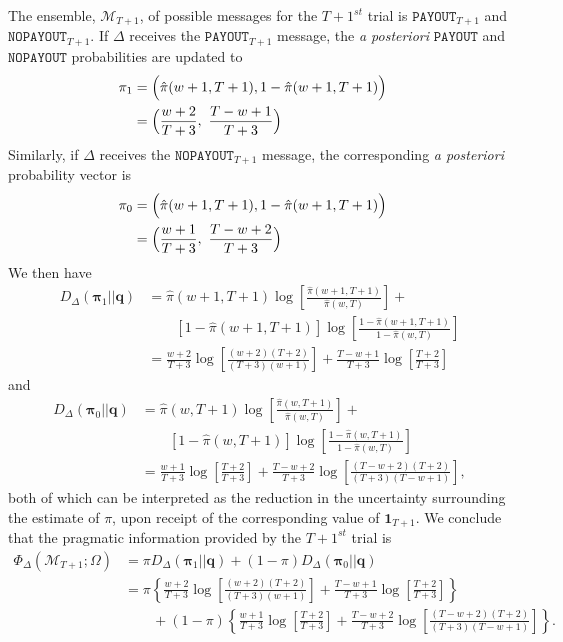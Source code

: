 \documentclass[11pt]{article}
\begin{document}
The ensemble, $\mathcal M_{T+1}$, of possible messages for the $T+1^{st}$ trial is $\mathtt{PAYOUT}_{T+1}$ and $\mathtt{NO PAYOUT}_{T+1}$.  If $\Delta$ receives the $\mathtt{PAYOUT}_{T+1}$ message, 
the {\it a posteriori} $\mathtt{PAYOUT}$ and $\mathtt{NO PAYOUT}$ probabilities are updated to
\begin{align*}
\mathbf \pi_1 &= \Big(\hat \pi(w+1, T+1), 1 - \hat \pi(w+1, T+1)\Big) \cr
                  &= \Big(\frac{w+2}{T+3},\ \frac{T-w+1}{T+3}\Big) \cr
\end{align*}
Similarly, if $\Delta$ receives the $\mathtt{NOPAYOUT}_{T+1}$ message,
the corresponding {\it a posteriori} probability vector is
\begin{align*}
\mathbf \pi_0 &= \Big(\hat \pi(w+1, T+1), 1 - \hat \pi(w+1, T+1)\Big) \cr
                  &= \Big(\frac{w+1}{T+3},\ \frac{T-w+2}{T+3}\Big) \cr
\end{align*}
We then have 
\begin{align*}
D_\Delta(\mathbf \pi_1 || \mathbf q) 
        &= \hat \pi(w+1, T+1) \log\left[\frac{\hat \pi(w+1, T+1)}{\hat \pi(w, T)}\right] + \\
        &  \qquad    \left[1 - \hat \pi(w+1, T+1)\right] \log\left[\frac{1 - \hat \pi(w+1, T+1)}{1 -\hat \pi(w, T)}\right] \\[10pt]
        &=\frac{w+2}{T+3}\log\left[\frac{(w+2)(T+2)}{(T+3)(w+1)}\right] + \frac{T-w+1}{T+3}\log\left[\frac{T+2}{T+3}\right]
\end{align*}
and
\begin{align*}
D_\Delta(\mathbf \pi_0 || \mathbf q) 
     &= \hat \pi(w, T+1) \log\left[\frac{\hat \pi(w, T+1)}{\hat \pi(w, T)}\right] + \\
     &  \qquad    \left[1 - \hat \pi(w, T+1)\right] \log\left[\frac{1 - \hat \pi(w, T+1)}{1 -\hat \pi(w, T)}\right] \\[10pt]
     &=\frac{w+1}{T+3}\log\left[\frac{T+2}{T+3}\right]+\frac{T-w+2}{T+3}\log\left[\frac{(T-w+2)(T+2)}{(T+3)(T-w+1)}\right],
\end{align*}
both of which can be interpreted as the reduction in the uncertainty surrounding the estimate of $\pi$, upon receipt of the corresponding value of $\mathbf 1_{T+1}$.  We conclude that the pragmatic information provided by the $T+1^{st}$ trial is
\begin{align*}
\Phi_\Delta \left(\mathcal M_{T+1}; \Omega\right) 
    &= \pi D_\Delta(\mathbf \pi_1 || \mathbf q) + (1-\pi) D_\Delta(\mathbf \pi_0 || \mathbf q)\\[10pt]
    &=\pi \left\{\frac{w+2}{T+3}\log\left[\frac{(w+2)(T+2)}{(T+3)(w+1)}\right] + \frac{T-w+1}{T+3}\log\left[\frac{T+2}{T+3}\right]\right\}  \\
    &  \qquad + (1-\pi)\left\{\frac{w+1}{T+3}\log\left[\frac{T+2}{T+3}\right] + 
                                     \frac{T-w+2}{T+3}\log\left[\frac{(T-w+2)(T+2)}{(T+3)(T-w+1)}\right]\right\}.
\end{align*}
\end{document}
